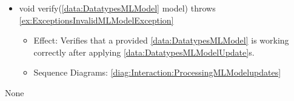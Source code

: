 \begin{description}
\begin{itemize}[noitemsep,nolistsep,leftmargin=-.25cm]
      \item \textsf{void verify(\ref{data:DatatypesMLModel} model) throws \ref{ex:ExceptionsInvalidMLModelException}}
        \begin{itemize}[noitemsep,nolistsep]
           \item Effect: Verifies that a provided \ref{data:DatatypesMLModel} is working correctly after applying \ref{data:DatatypesMLModelUpdate}s. 
           \item Sequence Diagrams: \cref{diag:Interaction:ProcessingMLModelupdates}
        \end{itemize}
    \end{itemize}
      \item[Diagrams:] None
    \end{description}

